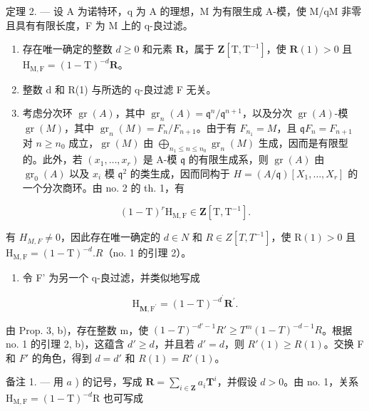 定理 2. --- 设 A 为诺特环，q 为 A 的理想，M 为有限生成 A-模，使 M/qM 非零且具有有限长度，F 为 M 上的 q-良过滤。

\begin{enumerate}
\def\labelenumi{\alph{enumi})}
\item
  存在唯一确定的整数 \(d \geqslant 0\) 和元素 \(\mathbf{R}\)，属于 \(\mathbf{Z}[\mathrm{T}, \mathrm{T}^{-1}]\)，使 \(\mathbf{R}(1) > 0\) 且 \(\mathrm{H}_{\mathrm{M,F}} = (1 - \mathrm{T})^{-d}\mathbf{R}\)。
\item
  整数 d 和 R(1) 与所选的 q-良过滤 F 无关。
\item
  考虑分次环 \(\operatorname{gr}(A)\)，其中 \(\operatorname{gr}_{n}(A) = \mathfrak{q}^{n}/\mathfrak{q}^{n+1}\)，以及分次 \(\operatorname{gr}(A)\)-模 \(\operatorname{gr}(M)\)，其中 \(\operatorname{gr}_{n}(M) = F_{n}/F_{n+1}\)。由于有 \(F_{n_{1}} = M\)，且 \(\mathfrak{q}F_{n} = F_{n+1}\) 对 \(n \geqslant n_{0}\) 成立，\(\operatorname{gr}(M)\) 由 \(\bigoplus_{n_{1} \leqslant n \leqslant n_{0}} \operatorname{gr}_{n}(M)\) 生成，因而是有限型的。此外，若 \((x_{1},\ldots,x_{r})\) 是 A-模 \(\mathfrak{q}\) 的有限生成系，则 \(\operatorname{gr}(A)\) 由 \(\operatorname{gr}_{0}(A)\) 以及 \(x_{i}\) 模 \(\mathfrak{q}^{2}\) 的类生成，因而同构于 \(H = (A/\mathfrak{q})[X_{1},\ldots,X_{r}]\) 的一个分次商环。由 no. 2 的 th. 1，有
\end{enumerate}

\[
(1 - \mathrm{T}) ^ {r} \mathrm{H} _ {\mathrm{M}, \mathrm{F}} \in \mathbf {Z} [ \mathrm{T}, \mathrm{T} ^ {- 1} ].
\]

有 \(H_{M,F} \neq 0\)，因此存在唯一确定的 \(d \in N\) 和 \(R \in Z[T, T^{-1}]\)，使 \(\mathrm{R}(1) > 0\) 且 \(\mathrm{H}_{\mathrm{M},\mathrm{F}} = (1 - \mathrm{T})^{-d}. R\)（no. 1 的引理 2）。

\begin{enumerate}
\def\labelenumi{\alph{enumi})}
\setcounter{enumi}{1}
\tightlist
\item
  令 F' 为另一个 q-良过滤，并类似地写成
\end{enumerate}

\[
\mathrm{H} _ {\mathbf {M}, \mathrm{F} ^ {\prime}} = (1 - \mathrm{T}) ^ {- d ^ {\prime}} \mathbf {R} ^ {\prime}.
\]

由 Prop. 3, b)，存在整数 m，使 \((1 - T)^{-d'-1}R' \geqslant T^{m}(1 - T)^{-d-1}R\)。根据 no. 1 的引理 2, b)，这蕴含 \(d' \geqslant d\)，并且若 \(d' = d\)，则 \(R'(1) \geqslant R(1)\)。交换 F 和 \(F'\) 的角色，得到 \(d = d'\) 和 \(R(1) = R'(1)\)。

备注 1. --- 用 \(a\) ) 的记号，写成 \(\mathbf{R} = \sum_{i \in \mathbf{Z}} a_i \mathbf{T}^i\)，并假设 \(d > 0\)。由 no. 1，关系 \(\mathrm{H}_{\mathrm{M},\mathrm{F}} = (1 - \mathrm{T})^{-d}\mathrm{R}\) 也可写成

